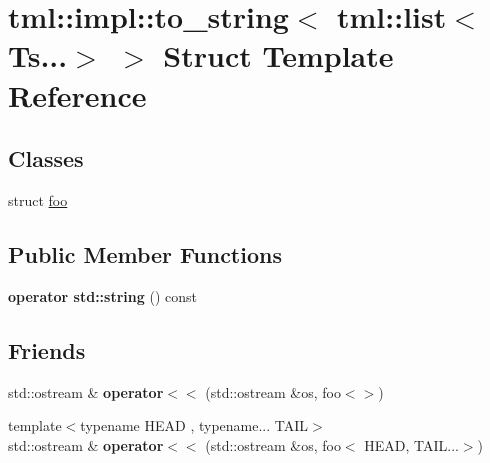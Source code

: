 \hypertarget{structtml_1_1impl_1_1to__string_3_01tml_1_1list_3_01_ts_8_8_8_4_01_4}{\section{tml\+:\+:impl\+:\+:to\+\_\+string$<$ tml\+:\+:list$<$ Ts...$>$ $>$ Struct Template Reference}
\label{structtml_1_1impl_1_1to__string_3_01tml_1_1list_3_01_ts_8_8_8_4_01_4}
}
\subsection*{Classes}
\begin{DoxyCompactItemize}
\item 
struct \hyperlink{structtml_1_1impl_1_1to__string_3_01tml_1_1list_3_01_ts_8_8_8_4_01_4_1_1foo}{foo}
\end{DoxyCompactItemize}
\subsection*{Public Member Functions}
\begin{DoxyCompactItemize}
\item 
\hypertarget{structtml_1_1impl_1_1to__string_3_01tml_1_1list_3_01_ts_8_8_8_4_01_4_aa6aa7110aaaf90f5457c003556e93d83}{{\bfseries operator std\+::string} () const }\label{structtml_1_1impl_1_1to__string_3_01tml_1_1list_3_01_ts_8_8_8_4_01_4_aa6aa7110aaaf90f5457c003556e93d83}

\end{DoxyCompactItemize}
\subsection*{Friends}
\begin{DoxyCompactItemize}
\item 
\hypertarget{structtml_1_1impl_1_1to__string_3_01tml_1_1list_3_01_ts_8_8_8_4_01_4_a33a4a844f63a154e40604f7a7c837c4d}{std\+::ostream \& {\bfseries operator$<$$<$} (std\+::ostream \&os, foo$<$$>$)}\label{structtml_1_1impl_1_1to__string_3_01tml_1_1list_3_01_ts_8_8_8_4_01_4_a33a4a844f63a154e40604f7a7c837c4d}

\item 
\hypertarget{structtml_1_1impl_1_1to__string_3_01tml_1_1list_3_01_ts_8_8_8_4_01_4_a1603311c53e22c3f99695f06edd128f8}{{\footnotesize template$<$typename H\+E\+A\+D , typename... T\+A\+I\+L$>$ }\\std\+::ostream \& {\bfseries operator$<$$<$} (std\+::ostream \&os, foo$<$ H\+E\+A\+D, T\+A\+I\+L...$>$)}\label{structtml_1_1impl_1_1to__string_3_01tml_1_1list_3_01_ts_8_8_8_4_01_4_a1603311c53e22c3f99695f06edd128f8}

\end{DoxyCompactItemize}


